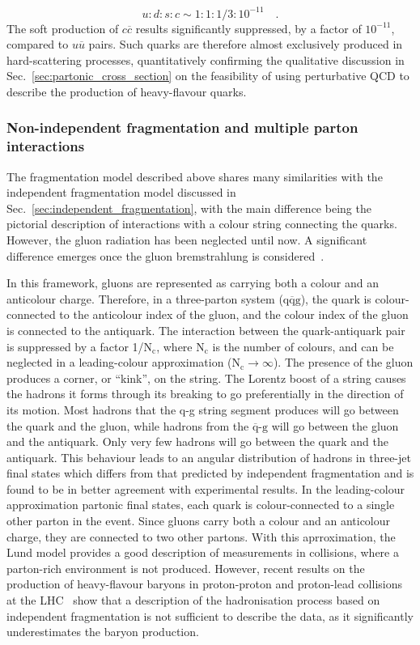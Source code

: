 \begin{equation*}
    u : d : s : c \sim 1 : 1 : 1/3 : 10^{-11}\quad .
\end{equation*}
The soft production of $c\overline{c}$ results significantly suppressed, by a factor of $10^{-11}$, compared to $u\overline{u}$ pairs. Such quarks are therefore almost exclusively produced in hard-scattering processes, quantitatively confirming the qualitative discussion in Sec.~\ref{sec:partonic_cross_section} on the feasibility of using perturbative QCD to describe the production of heavy-flavour quarks.

\subsubsection{Non-independent fragmentation and multiple parton interactions}
The fragmentation model described above shares many similarities with the independent fragmentation model discussed in Sec.~\ref{sec:independent_fragmentation}, with the main difference being the pictorial description of interactions with a colour string connecting the quarks. However, the gluon radiation has been neglected until now. A significant difference emerges once the gluon bremstrahlung is considered~\cite{Sjostrand:1984ic}. 

In this framework, gluons are represented as carrying both a colour and an anticolour charge. Therefore, in a three-parton system ($\mathrm{q\overline{q}g}$), the quark is colour-connected to the anticolour index of the gluon, and the colour index of the gluon is connected to the antiquark. The interaction between the quark-antiquark pair is suppressed by a factor 1/$\mathrm{N_c}$, where $\mathrm{N_c}$ is the number of colours, and can be neglected in a leading-colour approximation ($\mathrm{N_c} \rightarrow\infty$). The presence of the gluon produces a corner, or “kink”, on the string. The Lorentz boost of a string causes the hadrons it forms through its breaking to go preferentially in the direction of its motion. Most hadrons that the q-g string segment produces will go between the quark and the gluon, while hadrons from the $\mathrm{\overline{q}\text{-}g}$ will go between the gluon and the antiquark. Only very few hadrons will go between the quark and the antiquark. This behaviour leads to an angular distribution of hadrons in \ee three-jet final states which differs from that predicted by independent fragmentation and is found to be in better agreement with experimental results. In the leading-colour approximation partonic final states, each quark is colour-connected to a single other parton in the event. Since gluons carry both a colour and an anticolour charge, they are connected to two other partons. With this aprroximation, the Lund model provides a good description of measurements in \ee collisions, where a parton-rich environment is not produced. However, recent results on the production of heavy-flavour baryons in proton-proton and proton-lead collisions at the LHC~\cite{ALICE:2022exq,ALICE:xic0} show that a description of the hadronisation process based on independent fragmentation is not sufficient to describe the data, as it significantly underestimates the baryon production.

